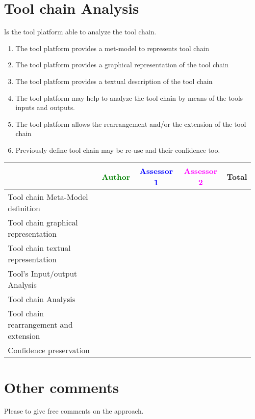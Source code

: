 \section{Tool chain Analysis}
Is the tool platform able to analyze the tool chain.
\begin{enumerate}
\item The tool platform provides a met-model to represents tool chain
\item The tool platform provides a graphical representation of the
  tool chain
\item The tool platform provides a textual description of the
  tool chain
\item The tool platform may help to analyze the tool chain by means
  of the tools inputs and outputs.
\item The tool platform allows the rearrangement and/or the extension
  of the tool chain
\item Previously define tool chain may be re-use and their confidence too.
\end{enumerate}

\begin{tabular}{|l | c | c | c | c|} \hline
  & \textcolor{green}{Author} & \textcolor{blue}{Assessor 1} &  \textcolor{magenta}{Assessor 2} & Total \\
  \hline Tool chain Meta-Model definition &
  &                 &                  &\\
  \hline Tool chain graphical representation &
  &                 &                  &\\
  \hline Tool chain textual representation &
  &                 &                  &\\
  \hline Tool's Input/output Analysis &
  &                 &                  &\\
  \hline Tool chain Analysis &
  &                 &                  &\\
  \hline Tool chain rearrangement and extension &
  &                 &                  &\\
  \hline Confidence preservation &
  &                 &                  &\\
  \hline
\end{tabular}


\section{Other comments}
Please to  give free comments on the approach.

